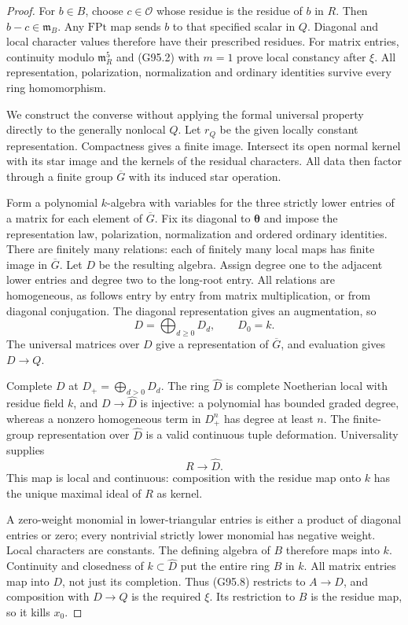 \begin{proof}
For \(b\in B\), choose \(c\in\mathcal O\) whose residue is
the residue of \(b\) in \(R\).  Then \(b-c\in\mathfrak m_B\).
Any \(\mathrm{FPt}\) map sends \(b\) to that specified scalar
in \(Q\).  Diagonal and local character values therefore
have their prescribed residues.
For matrix entries, continuity modulo \(\mathfrak m_R^5\)
and (G95.2) with \(m=1\) prove local constancy after \(\xi\).
All representation, polarization, normalization and ordinary
identities survive every ring homomorphism.

We construct the converse without applying the formal
universal property directly to the generally nonlocal \(Q\).
Let \(r_Q\) be the given locally constant representation.
Compactness gives a finite image.  Intersect its open normal
kernel with its star image and the kernels of the residual
characters.  All data then factor through a finite group
\(\overline G\) with its induced star operation.

Form a polynomial \(k\)-algebra with variables for the
three strictly lower entries of a matrix for each element
of \(\overline G\).  Fix its diagonal to
\(\boldsymbol\theta\) and impose the representation law,
polarization, normalization and ordered ordinary identities.
There are finitely many relations: each of finitely many
local maps has finite image in \(\overline G\).
Let \(D\) be the resulting algebra.
Assign degree one to the adjacent lower entries and
degree two to the long-root entry.
All relations are homogeneous, as follows entry by entry
from matrix multiplication, or from diagonal conjugation.
The diagonal representation gives an augmentation, so
\[
 D=\bigoplus_{d\geq0}D_d,\qquad D_0=k .
 \tag{G95.7}
\]
The universal matrices over \(D\) give a representation
of \(\overline G\), and evaluation gives \(D\to Q\).

Complete \(D\) at \(D_+=\bigoplus_{d>0}D_d\).
The ring \(\widehat D\) is complete Noetherian local
with residue field \(k\), and \(D\to\widehat D\) is injective:
a polynomial has bounded graded degree, whereas a
nonzero homogeneous term in \(D_+^n\) has degree at least \(n\).
The finite-group representation over \(\widehat D\)
is a valid continuous tuple deformation.
Universality supplies
\[
 R\longrightarrow\widehat D .
 \tag{G95.8}
\]
This map is local and continuous: composition with the
residue map onto \(k\) has the unique maximal ideal of \(R\)
as kernel.

A zero-weight monomial in lower-triangular entries is
either a product of diagonal entries or zero; every
nontrivial strictly lower monomial has negative weight.
Local characters are constants.
The defining algebra of \(B\) therefore maps into \(k\).
Continuity and closedness of \(k\subset\widehat D\)
put the entire ring \(B\) in \(k\).
All matrix entries map into \(D\), not just its completion.
Thus (G95.8) restricts to \(A\to D\), and composition with
\(D\to Q\) is the required \(\xi\).
Its restriction to \(B\) is the residue map, so it kills \(x_0\).


\end{proof}
